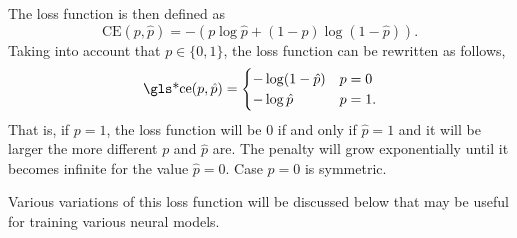The loss function is then defined as
\begin{equation}
  \text{CE}(p, \hat{p}) = -(p\log\hat{p} + (1 - p)\log(1 - \hat{p})).
\end{equation}
Taking into account that \(p \in \{0, 1\}\), the loss function can be rewritten
as follows,
\begin{equation}
  \text{\gls*{ce}}(p, \hat{p}) =
  \begin{cases}
    -\log(1 - \hat{p}) & p = 0 \\
    -\log\hat{p} & p = 1.
  \end{cases}
\end{equation}
That is, if \(p = 1\), the loss function will be \(0\) if and only if
\(\hat{p} = 1\) and it will be larger the more different \(p\) and \(\hat{p}\)
are. The penalty will grow exponentially until it becomes infinite for the
value \(\hat{p} = 0\). Case \(p = 0\) is symmetric.

Various variations of this loss function will be discussed below that may be
useful for training various neural models.

